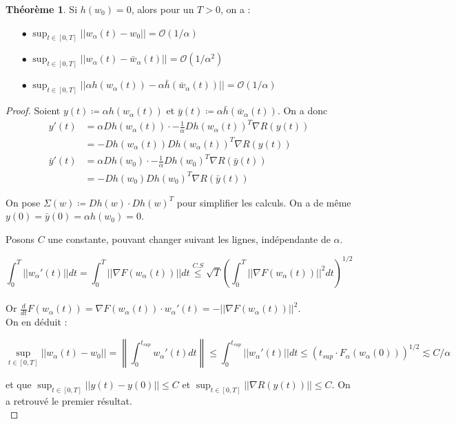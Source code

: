 \documentclass[a4paper, 11pt, french]{article}
\theoremstyle{definition}
\newtheorem{theorem}{Théorème}
\newcommand{\norm}[1]{\left\lVert#1\right\rVert}
\begin{document}
	\begin{theorem}
		Si $h(w_0) = 0$, alors pour un $T > 0$, on a :
		\begin{itemize}
			\item[$\bullet$] $\sup_{t \in [0, T]} ||w_{\alpha}(t) - w_0|| = \mathcal{O}(1 / \alpha)$
			\item[$\bullet$] $\sup_{t \in [0, T]} ||w_{\alpha}(t) - \bar{w}_{\alpha}(t)|| = \mathcal{O}(1 / \alpha^2)$
			\item[$\bullet$] $\sup_{t \in [0, T]} ||\alpha h(w_{\alpha}(t)) - \alpha \bar{h}(\bar{w}_{\alpha}(t))|| = \mathcal{O}(1 / \alpha)$
		\end{itemize}
	\end{theorem}
	\begin{proof}
		 Soient $y(t) \coloneqq \alpha h(w_{\alpha}(t))$ et $\bar{y}(t) \coloneqq \alpha \bar{h}(\bar{w}_{\alpha}(t))$. On a donc 
		 \begin{align*}
		 	y'(t) &= \alpha Dh(w_{\alpha}(t)) \cdot - \frac{1}{\alpha} Dh (w_{\alpha}(t))^T \nabla R (y(t)) \\
		 	&= - Dh(w_{\alpha}(t)) Dh (w_{\alpha}(t))^T \nabla R(y(t)) \\
	 		\bar{y}'(t) &= \alpha Dh(w_0) \cdot - \frac{1}{\alpha} Dh (w_0)^T \nabla R(\bar{y}(t)) \\
	 		&= - Dh(w_0)Dh (w_0)^T \nabla R (\bar{y}(t))
		 \end{align*}
	 
		On pose $\Sigma (w) \coloneqq Dh(w) \cdot Dh (w)^T$ pour simplifier les calculs. On a de même $y(0) = \bar{y}(0) = \alpha h(w_0) = 0$.
		
		Posons $C$ une constante, pouvant changer suivant les lignes, indépendante de $\alpha$.
		
		\[\int_0^T ||w_{\alpha}'(t)|| dt = \int_0^T ||\nabla F(w_{\alpha}(t))|| dt \stackrel{C.S}{\leq} \sqrt{T} \left( \int_0^T ||\nabla F(w_{\alpha}(t))||^2 dt \right)^{1/2} \] \\
	 	
	 	Or $\frac{d}{dt} F(w_{\alpha}(t)) = \nabla F(w_{\alpha}(t)) \cdot w_{\alpha}'(t) = -||\nabla F(w_{\alpha}(t))||^2$. \\
	 	
	 	On en déduit :
	 	
	 	\[\sup_{t \in [0, T]} ||w_{\alpha}(t) - w_0|| = \norm{\int_0^{t_{sup}} w_{\alpha}'(t) dt}  \leq \int_0^{t_{sup}} ||w_{\alpha}'(t)|| dt \leq (t_{sup} \cdot F_{\alpha}(w_{\alpha}(0)))^{1/2} \lesssim C / \alpha\]
	 	
	 	et que $\sup_{t \in [0, T]} ||y(t) - y(0)|| \leq C$ et $\sup_{t \in [0, T]} ||\nabla R(y(t))|| \leq C$. On a retrouvé le premier résultat. \\
	 	

\end{proof}
\end{document}
